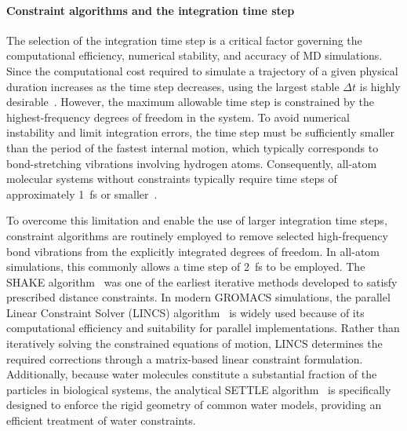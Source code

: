 \paragraph{Constraint algorithms and the integration time step}

The selection of the integration time step is a critical factor governing the computational efficiency, numerical stability, and accuracy of MD simulations. Since the computational cost required to simulate a trajectory of a given physical duration increases as the time step decreases, using the largest stable $\Delta t$ is highly desirable~\cite{Conde2022}. However, the maximum allowable time step is constrained by the highest-frequency degrees of freedom in the system. To avoid numerical instability and limit integration errors, the time step must be sufficiently smaller than the period of the fastest internal motion, which typically corresponds to bond-stretching vibrations involving hydrogen atoms. Consequently, all-atom molecular systems without constraints typically require time steps of approximately 1~fs or smaller~\cite{Feenstra1999,Conde2022}.

To overcome this limitation and enable the use of larger integration time steps, constraint algorithms are routinely employed to remove selected high-frequency bond vibrations from the explicitly integrated degrees of freedom. In all-atom simulations, this commonly allows a time step of 2~fs to be employed. The SHAKE algorithm~\cite{SH2,shake_algorithm} was one of the earliest iterative methods developed to satisfy prescribed distance constraints. In modern GROMACS simulations, the parallel Linear Constraint Solver (LINCS) algorithm~\cite{lincs_algorithm} is widely used because of its computational efficiency and suitability for parallel implementations. Rather than iteratively solving the constrained equations of motion, LINCS determines the required corrections through a matrix-based linear constraint formulation. Additionally, because water molecules constitute a substantial fraction of the particles in biological systems, the analytical SETTLE algorithm~\cite{settle_algorithm} is specifically designed to enforce the rigid geometry of common water models, providing an efficient treatment of water constraints.

